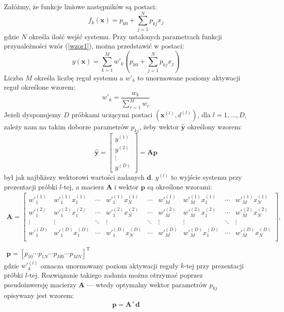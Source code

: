 \documentclass[a4paper,12pt,titlepage]{article}
\newcommand{\x}{\ensuremath{\mathbf{x}}}
\begin{document}
Załóżmy, że funkcje liniowe następników są postaci:
\begin{equation}
f_{k}(\x ) = p_{k0} + \sum_{j=1}^{N}p_{kj}x_{j}
\end{equation}
gdzie $N$ określa ilość wejść systemu. Przy ustalonych parametrach funkcji przynależności wzór (\ref{wzor1}), można przedstawić w postaci:
\begin{equation}
y(\x ) = \sum_{k=1}^{M} w'_{k}(p_{k0} + \sum_{j=1}^{N}p_{kj}x_{j})
\end{equation}
Liczba $M$ określa liczbę reguł systemu a $w'_{k}$ to unormowane poziomy aktywacji reguł określone wzorem:
\begin{equation}
w'_{k} = \frac{w_k}{\sum_{r=1}^{M}w_r}
\end{equation}
Jeżeli dysponujemy $D$ próbkami uczącymi postaci $(\mathbf{x}^{(l)}, d^{(l)})$, dla $l=1,\ldots,D$, zależy nam na takim doborze parametrów $p_{kj}$, żeby wektor $\mathbf{\hat{y}}$ określony wzorem:
\begin{equation}
\mathbf{\hat{y}} = 
\left[ \begin{array}{c}
y^{(1)} \\ y^{(2)} \\ \vdots \\ y^{(D)}
\end{array} \right]
= \mathbf{A}\mathbf{p}
\end{equation}
był jak najbliższy wektorowi wartości zadanych $\mathbf{d}$. $y^{(l)}$ to wyjście systemu przy prezentacji próbki $l$-tej, a macierz $\mathbf{A}$ i wektor $\mathbf{p}$ są określone wzorami:
\begin{equation}
\begin{array}{c}
\mathbf{A} = 
\left[
\begin{array}{ccccccccc}
w'^{(1)}_1 & w'^{(1)}_1x_1^{(1)} & \cdots & w'^{(1)}_1x_N^{(1)} & \cdots & w'^{(1)}_M & w'^{(1)}_Mx_1^{(1)} & \cdots & w'^{(1)}_Mx_N^{(1)} \\
w'^{(2)}_1 & w'^{(2)}_1x_1^{(2)} & \cdots & w'^{(2)}_1x_N^{(2)} & \cdots & w'^{(2)}_M & w'^{(2)}_Mx_1^{(2)} & \cdots & w'^{(2)}_Mx_N^{(2)} \\
\vdots & \vdots & \ddots & \vdots & \ddots & \vdots & \vdots & \ddots & \vdots \\
w'^{(D)}_1 & w'^{(D)}_1x_1^{(D)} & \cdots & w'^{(D)}_1x_N^{(D)} & \cdots & w'^{(D)}_M & w'^{(D)}_Mx_1^{(D)} & \cdots & w'^{(D)}_Mx_N^{(D)} \\
\end{array}\right], \\ \\
\mathbf{p} = [p_{10} \cdots p_{1N} \cdots p_{M0} \cdots p_{MN}]^{\mathrm{T}}
\end{array}
\end{equation}
gdzie $w'^{(l)}_k$ oznacza unormowany poziom aktywacji reguły $k$-tej przy prezentacji próbki $l$-tej.  Rozwiązanie takiego zadania można otrzymać poprzez pseudoinwersję macierzy $\mathbf{A}$ --- wtedy optymalny wektor parametrów $p_{kj}$ opisywany jest wzorem:
\begin{equation}
\mathbf{p} = \mathbf{A}^{+}\mathbf{d}
\end{equation}
\end{document}
